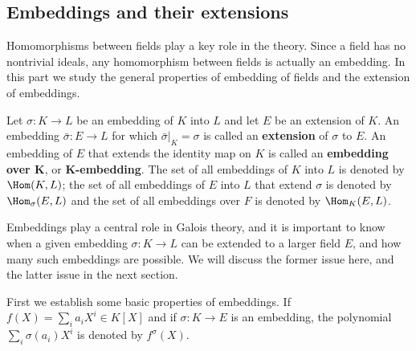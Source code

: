 \subsection{Embeddings and their extensions}
Homomorphisms between fields play a key role in the theory. Since a field has no nontrivial ideals, any homomorphism between fields is actually an embedding. In this part we study the general properties of embedding of fields and the extension of embeddings.\par
Let $\sigma:K\to L$ be an embedding of $K$ into $L$ and let $E$ be an extension of $K$. An embedding $\bar{\sigma}:E\to L$ for which $\bar{\sigma}|_K=\sigma$ is called an \textbf{extension} of $\sigma$ to $E$. An embedding of $E$ that extends the identity map on $K$ is called an \textbf{embedding over $\bm{K}$}, or \textbf{$\bm{K}$-embedding}. The set of all embeddings of $K$ into $L$ is denoted by $\Hom(K,L)$; the set of all embeddings of $E$ into $L$ that extend $\sigma$ is denoted by $\Hom_{\sigma}(E,L)$ and the set of all embeddings over $F$ is denoted by $\Hom_K(E,L)$.\par
Embeddings play a central role in Galois theory, and it is important to know when a given embedding $\sigma:K\to L$ can be extended to a larger field $E$, and how many such embeddings are possible. We will discuss the former issue here, and the latter issue in the next section.\par
First we establish some basic properties of embeddings. If $f(X)=\sum_ia_iX^i\in K[X]$ and if $\sigma:K\to E$ is an embedding, the polynomial $\sum_i\sigma(a_i)X^i$ is denoted by $f^\sigma(X)$.
